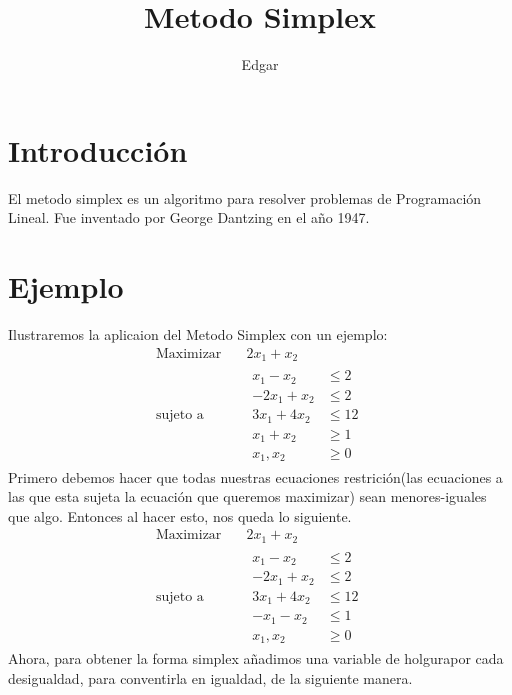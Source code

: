 \documentclass{article}
\title{Metodo Simplex}
\author{Edgar}
\begin{document}
\maketitle
\section{Introducción}
\label{sec:introduccion}
El metodo simplex es un algoritmo para resolver problemas de
Programación Lineal. Fue inventado por George Dantzing  en el año
1947.

\section{Ejemplo}
\label{sec:ejemplo}
Ilustraremos la aplicaion del Metodo Simplex con un ejemplo:\\
\begin{equation*}
  \begin{aligned}
    \text{Maximizar} \quad & 2x_{1}+x_{2}\\
    \text{sujeto a} \quad &
    \begin{aligned}
      x_{1}-x_{2}  &\leq 2\\
      -2x_{1}+x_{2}&\leq 2\\
      3x_{1}+4x_{2}&\leq 12\\
      x_{1}+x_{2}  &\geq 1\\
      x_{1},x_{2}  &\geq 0
    \end{aligned}
  \end{aligned}
\end{equation*}
Primero debemos hacer que todas nuestras ecuaciones restrición(las
ecuaciones a las que esta sujeta la ecuación que queremos maximizar)
sean menores-iguales que algo.
Entonces al hacer esto, nos queda lo siguiente.
\begin{equation*}
  \begin{aligned}
    \text{Maximizar} \quad & 2x_{1}+x_{2}\\
    \text{sujeto a} \quad &
    \begin{aligned}
      x_{1}-x_{2}  &\leq 2\\
      -2x_{1}+x_{2}&\leq 2\\
      3x_{1}+4x_{2}&\leq 12\\
      -x_{1}-x_{2}  &\leq 1\\
      x_{1},x_{2}  &\geq 0
    \end{aligned}
  \end{aligned}
\end{equation*}
Ahora, para obtener la forma simplex añadimos una variable de
holgurapor cada desigualdad, para conventirla en igualdad, de la
siguiente manera.
\end{document}
